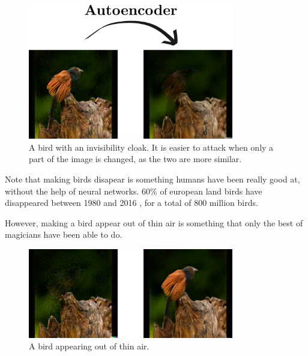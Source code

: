 \documentclass[]{scrarticle}
\begin{document}
\begin{figure}[h]
  \centering
  \includegraphics[width=0.8\textwidth]{images/bird-no-bird.png}
  \caption{
    A bird with an invisibility cloak.
    It is easier to attack when only a part of the image is changed,
    as the two are more similar.
  }
\end{figure}

Note that making birds disapear is something humans have been really good at,
without the help of neural networks.
60\% of european land birds have disappeared between 1980 and 2016
\cite{Rigal2023FarmlandPA}, for a total of 800 million birds.

However, making a bird appear out of thin air is something that
only the best of magicians have been able to do.

\begin{figure}[h]
  \centering
  \includegraphics[width=0.8\textwidth]{images/bird-resurected.png}
  \caption{
    A bird appearing out of thin air.
  }
\end{figure}







\clearpage


\end{document}
